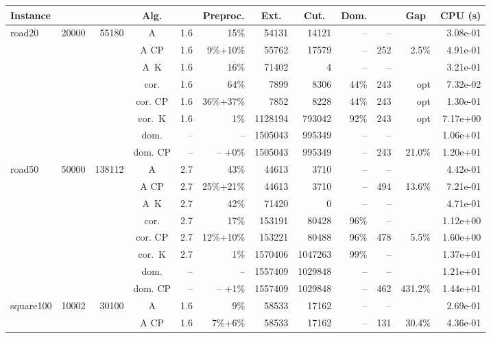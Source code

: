 \documentclass[11pt]{amsart}
\newenvironment{outdent}
{\begin{list}{}{\leftmargin-2cm\rightmargin\leftmargin}\centering\item\relax}
{\end{list}\ignorespacesafterend}
\theoremstyle{plain}
\theoremstyle{remark}
\begin{document}
\begin{table}
\begin{outdent}
\begin{footnotesize}
\begin{tabular}{|l|rrc|rr|rrr|rr|r|}
\hline
Instance 
& \multicolumn{1}{c}{} 
& \multicolumn{1}{c}{} 
& \multicolumn{1}{c|}{Alg.} 
& \multicolumn{1}{c}{} 
& \multicolumn{1}{c|}{Preproc.} 
& \multicolumn{1}{c}{Ext.} 
& \multicolumn{1}{c}{Cut.} 
& \multicolumn{1}{c|}{Dom.} 
& \multicolumn{1}{c}{} 
& \multicolumn{1}{c|}{Gap} 
& \multicolumn{1}{c|}{CPU (s)} \\
\hline
road20 & 20000 & 55180 & A & 1.6 & 15\% &54131 & 14121 & -- & -- & & 3.08e-01 \\
&&&A CP & 1.6 & 9\%+10\% &55762 & 17579 & -- &252 & 2.5\% & 4.91e-01 \\
&&&A~K & 1.6 & 16\% &71402 & 4 & -- & -- & & 3.21e-01 \\
&&&cor. & 1.6 & 64\% &7899 & 8306 & 44\% &243 & opt & 7.32e-02 \\
&&&cor. CP & 1.6 & 36\%+37\% &7852 & 8228 & 44\% &243 & opt & 1.30e-01 \\
&&&cor.~K & 1.6 & 1\% &1128194 & 793042 & 92\% &243 & opt & 7.17e+00 \\
&&&dom. & -- & --  &1505043 & 995349 & -- & -- & & 1.06e+01 \\
&&&dom. CP & -- & -- +0\% &1505043 & 995349 & -- &243 & 21.0\% & 1.20e+01 \\
\hline
road50 & 50000 & 138112 & A & 2.7 & 43\% &44613 & 3710 & -- & -- & & 4.42e-01 \\
&&&A CP & 2.7 & 25\%+21\% &44613 & 3710 & -- &494 & 13.6\% & 7.21e-01 \\
&&&A~K & 2.7 & 42\% &71420 & 0 & -- & -- & & 4.71e-01 \\
&&&cor. & 2.7 & 17\% &153191 & 80428 & 96\% & -- & & 1.12e+00 \\
&&&cor. CP & 2.7 & 12\%+10\% &153221 & 80488 & 96\% &478 & 5.5\% & 1.60e+00 \\
&&&cor.~K & 2.7 & 1\% &1570406 & 1047263 & 99\% & -- & & 1.37e+01 \\
&&&dom. & -- & --  &1557409 & 1029848 & -- & -- & & 1.21e+01 \\
&&&dom. CP & -- & -- +1\% &1557409 & 1029848 & -- &462 & 431.2\% & 1.44e+01 \\
\hline
square100 & 10002 & 30100 & A & 1.6 & 9\% &58533 & 17162 & -- & -- & & 2.69e-01 \\
&&&A CP & 1.6 & 7\%+6\% &58533 & 17162 & -- &131 & 30.4\% & 4.36e-01 \\

\end{tabular}
\end{footnotesize}
\end{outdent}
\end{table}
\end{document}
